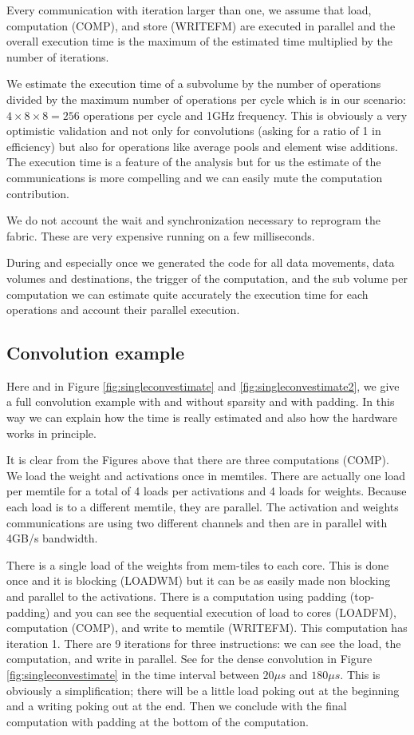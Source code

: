 \documentclass[conference]{IEEEtran}
\begin{document}
Every communication with iteration larger than one, we assume that
load, computation (COMP), and store (WRITEFM) are executed in parallel
and the overall execution time is the maximum of the estimated time
multiplied by the number of iterations.

We estimate the execution time of a subvolume by the number of
operations divided by the maximum number of operations per cycle which
is in our scenario: $4\times 8 \times 8 = 256 $ operations per cycle
and 1GHz frequency. This is obviously a very optimistic validation and
not only for convolutions (asking for a ratio of 1 in efficiency) but
also for operations like average pools and element wise additions. The
execution time is a feature of the analysis but for us the estimate of
the communications is more compelling and we can easily mute the
computation contribution.

We do not account the wait and synchronization necessary to reprogram
the fabric. These are very expensive running on a few milliseconds.

During and especially once we generated the code for all data
movements, data volumes and destinations, the trigger of the
computation, and the sub volume per computation we can estimate quite
accurately the execution time for each operations and account their
parallel execution.

\subsection{Convolution example}
Here and in Figure \ref{fig:singleconvestimate} and
\ref{fig:singleconvestimate2}, we give a full convolution example with
and without sparsity and with padding. In this way we can explain how
the time is really estimated and also how the hardware works in
principle.

It is clear from the Figures above that there are three computations
(COMP). We load the weight and activations once in memtiles. There are
actually one load per memtile for a total of 4 loads per activations
and 4 loads for weights. Because each load is to a different
memtile, they are parallel.  The activation and weights communications
are using two different channels and then are in parallel with 4GB/s
bandwidth.

There is a single load of the weights from mem-tiles to each
core. This is done once and it is blocking (LOADWM) but it can be as
easily made non blocking and parallel to the activations. There is a
computation using padding (top-padding) and you can see the sequential
execution of load to cores (LOADFM), computation (COMP), and write to
memtile (WRITEFM). This computation has iteration 1. There are 9
iterations for three instructions: we can see the load, the
computation, and write in parallel. See for the dense convolution in
Figure \ref{fig:singleconvestimate} in the time interval between $20\mu\!s$
and $180\mu\!s$.  This is obviously a simplification; there will be
a little load poking out at the beginning and a writing poking out at
the end.  Then we conclude with the final computation with padding at
the bottom of the computation.
\end{document}
